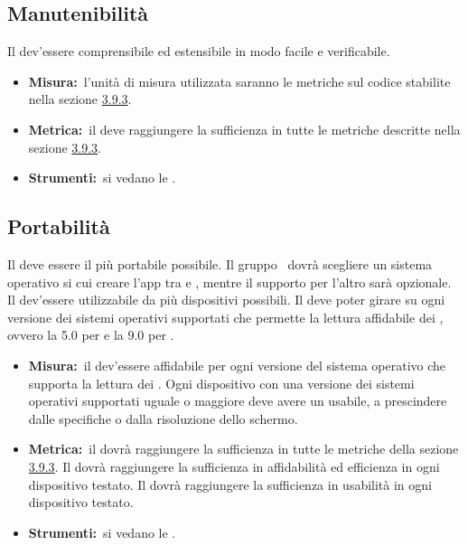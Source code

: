 	\subsection{Manutenibilità}
		Il  dev'essere comprensibile ed estensibile in modo facile e verificabile.
		\begin{itemize}
			\item \textbf{Misura:}\ l'unità di misura utilizzata saranno le metriche sul codice stabilite nella sezione \hyperref[sec:3.9.3]{3.9.3}.
			\item \textbf{Metrica:}\ il  deve raggiungere la sufficienza in tutte le metriche descritte nella sezione \hyperref[sec:3.9.3]{3.9.3}.
			\item \textbf{Strumenti:}\ si vedano le \NPdoc.
		\end{itemize}
	\subsection{Portabilità}
		Il  deve essere il più portabile possibile. Il gruppo \AUTORE\ dovrà scegliere un sistema operativo si cui creare l'app tra  e , mentre il supporto per l'altro sarà opzionale. Il  dev'essere utilizzabile da più dispositivi possibili. Il  deve poter girare su ogni versione dei sistemi operativi supportati che permette la lettura affidabile dei , ovvero la 5.0 per  e la 9.0 per .
		\begin{itemize}
			\item \textbf{Misura:}\ il  dev'essere affidabile per ogni versione del sistema operativo che supporta la lettura dei . Ogni dispositivo con una versione dei sistemi operativi supportati uguale o maggiore deve avere un  usabile, a prescindere dalle specifiche  o dalla risoluzione dello schermo.
			\item \textbf{Metrica:}\ il  dovrà raggiungere la sufficienza in tutte le metriche della sezione \hyperref[sec:3.9.3]{3.9.3}. Il  dovrà raggiungere la sufficienza in affidabilità ed efficienza in ogni dispositivo testato. Il  dovrà raggiungere la sufficienza in usabilità in ogni dispositivo testato.
			\item \textbf{Strumenti:}\ si vedano le \NPdoc.
		\end{itemize}

